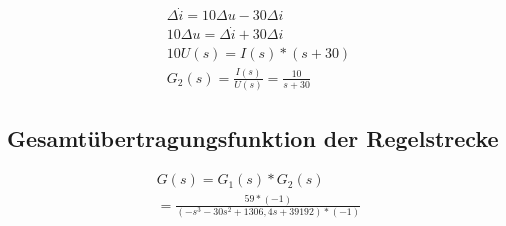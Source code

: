 \documentclass[10pt,a4paper]{article}
\begin{document}
\begin{figure}[H]
  \begin{align}
	  \Delta\dot{i} = 10 \Delta u -30 \Delta i \nonumber \\
	  10 \Delta u = \Delta \dot{i} + 30 \Delta i \nonumber \\
	  10 U(s) = I(s) * (s + 30) \nonumber \\
	  G_2(s) = \frac{I(s)}{U(s)} = \frac{10}{s + 30} \nonumber
  \end{align}
\end{figure}



\subsection{Gesamtübertragungsfunktion der Regelstrecke}
\begin{figure}[H]
  \begin{align}
	  G(s) = G_1(s) * G_2(s) \nonumber \\
	  = \frac{59 * (-1)}{(-s^3 -30s^2 + 1306,4s + 39192) * (-1)} \nonumber
  \end{align}
\end{figure}
\end{document}
